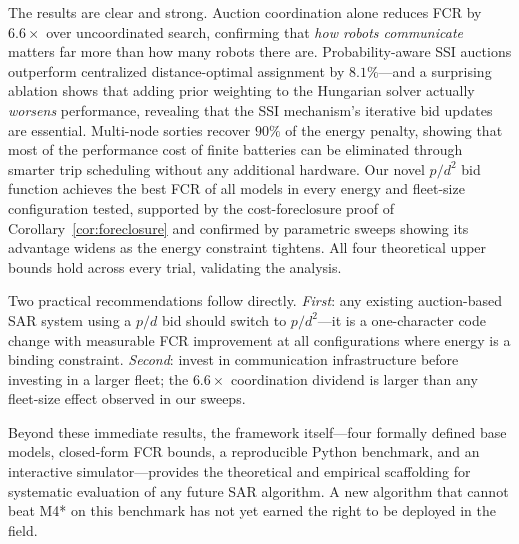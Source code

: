 \documentclass[conference]{IEEEtran}
\begin{document}
The results are clear and strong.
Auction coordination alone reduces FCR by $6.6\times$ over uncoordinated
search, confirming that \emph{how robots communicate} matters far more than
how many robots there are.
Probability-aware SSI auctions outperform centralized distance-optimal
assignment by $8.1\%$---and a surprising ablation shows that adding prior
weighting to the Hungarian solver actually \emph{worsens} performance,
revealing that the SSI mechanism's iterative bid updates are essential.
Multi-node sorties recover $90\%$ of the energy penalty, showing that
most of the performance cost of finite batteries can be eliminated through
smarter trip scheduling without any additional hardware.
Our novel $p/d^2$ bid function achieves the best FCR of all models in
every energy and fleet-size configuration tested, supported by the
cost-foreclosure proof of Corollary~\ref{cor:foreclosure} and confirmed by
parametric sweeps showing its advantage widens as the energy constraint
tightens.
All four theoretical upper bounds hold across every trial, validating the
analysis.

Two practical recommendations follow directly.
\emph{First}: any existing auction-based SAR system using a $p/d$ bid
should switch to $p/d^2$---it is a one-character code change with
measurable FCR improvement at all configurations where energy is a
binding constraint.
\emph{Second}: invest in communication infrastructure before investing in
a larger fleet; the $6.6\times$ coordination dividend is larger than
any fleet-size effect observed in our sweeps.

Beyond these immediate results, the framework itself---four formally defined
base models, closed-form FCR bounds, a reproducible Python benchmark, and an
interactive simulator---provides the theoretical and empirical scaffolding
for systematic evaluation of any future SAR algorithm.
A new algorithm that cannot beat M4* on this benchmark has not yet earned
the right to be deployed in the field.



\end{document}
